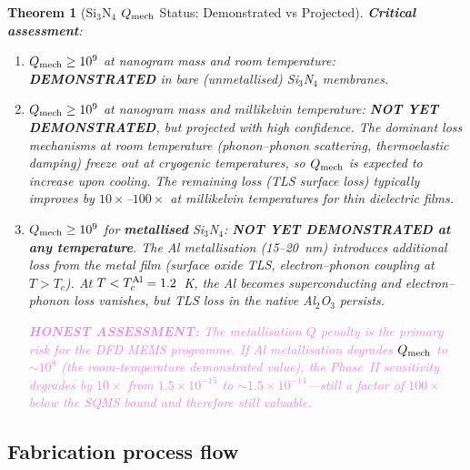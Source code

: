 \documentclass[11pt]{article}
\newtheorem{theorem}{Theorem}[section]
\theoremstyle{definition}
\theoremstyle{remark}
\newcommand{\ee}[1]{\times 10^{#1}}
\newcommand{\Qmech}{Q_{\rm mech}}
\newcommand{\honest}[1]{\textcolor{violet}{\textbf{HONEST ASSESSMENT:} #1}}
\begin{document}
\begin{theorem}[Si$_3$N$_4$ $\Qmech$ Status: Demonstrated vs Projected]
\textbf{Critical assessment}:
\begin{enumerate}[nosep]
  \item $\Qmech \geq 10^9$ at nanogram mass and room temperature:
    \textbf{DEMONSTRATED} in bare (unmetallised) Si$_3$N$_4$ membranes.
  \item $\Qmech \geq 10^9$ at nanogram mass and millikelvin temperature:
    \textbf{NOT YET DEMONSTRATED}, but projected with high confidence.
    The dominant loss mechanisms at room temperature (phonon--phonon
    scattering, thermoelastic damping) freeze out at cryogenic
    temperatures, so $\Qmech$ is expected to \emph{increase} upon
    cooling. The remaining loss (TLS surface loss) typically improves
    by $10\times$--$100\times$ at millikelvin temperatures for thin
    dielectric films.
  \item $\Qmech \geq 10^9$ for \textbf{metallised} Si$_3$N$_4$:
    \textbf{NOT YET DEMONSTRATED at any temperature}. The Al
    metallisation (15--20~nm) introduces additional loss from the
    metal film (surface oxide TLS, electron--phonon coupling at $T > T_c$).
    At $T < T_c^{\rm Al} = 1.2$~K, the Al becomes superconducting and
    electron--phonon loss vanishes, but TLS loss in the native Al$_2$O$_3$
    persists.

    \honest{The metallisation $Q$ penalty is the primary risk for the
    DFD MEMS programme. If Al metallisation degrades $\Qmech$ to
    $\sim 10^8$ (the room-temperature demonstrated value), the Phase~II
    sensitivity degrades by $10\times$ from $1.5\ee{-15}$ to
    $\sim 1.5\ee{-14}$---still a factor of $100\times$ below the
    SQMS bound and therefore still valuable.}
\end{enumerate}
\end{theorem}

\subsection{Fabrication process flow}
\end{document}
